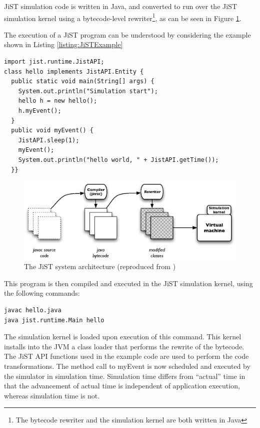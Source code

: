 JiST simulation code is written in Java, and converted to run over the JiST 
simulation kernel using a bytecode-level rewriter\footnote{The bytecode 
rewriter and the simulation kernel are both written in Java},  as can be
seen in Figure \ref{Fig:JiST_architecture}.

The execution of a JiST program can be understood by considering the example 
shown in Listing \ref{listing:JiSTExample}

\begin{lstlisting}[frame=trbl, basewidth={0.55em, 0.6em}, captionpos=b, 
basicstyle=\ttfamily\footnotesize, breaklines, caption = Example JiST program (reproduced from \cite{barr_JIST:2005}, label = listing:JiSTExample]  
import jist.runtime.JistAPI;  
class hello implements JistAPI.Entity { 
  public static void main(String[] args) { 
    System.out.println("Simulation start"); 
    hello h = new hello(); 
    h.myEvent(); 
  } 
  public void myEvent() { 
    JistAPI.sleep(1); 
    myEvent(); 
    System.out.println("hello world, " + JistAPI.getTime()); 
  }} 
\end{lstlisting}

\begin{figure}
\centering
\includegraphics[width=\textwidth]{img/JiST_architecture.eps} 
\caption[The JiST System Architecture]{The JiST system architecture (reproduced from
\cite{barr_JIST:2005})}
\label{Fig:JiST_architecture}
\end{figure}  
 
This program is then compiled and executed in the JiST simulation
kernel, using the following commands:

  
\begin{lstlisting}[frame=trbl, basewidth={0.55em, 0.6em}, captionpos=b, 
basicstyle=\ttfamily\footnotesize, breaklines, caption = Execution of the
program in the JiST, label = listing:JiST ]  
javac hello.java
java jist.runtime.Main hello
\end{lstlisting}


The simulation kernel is loaded upon execution of this command. This kernel
installs into the JVM a class loader that performs the rewrite of the bytecode.
The JiST API functions used in the example code are used to perform the
code transformations. The method call to myEvent is now scheduled and executed
by the simulator in simulation time. Simulation time differs from ``actual''
time in that the advancement of actual time is independent of application
execution, whereas simulation time is not. 
 

